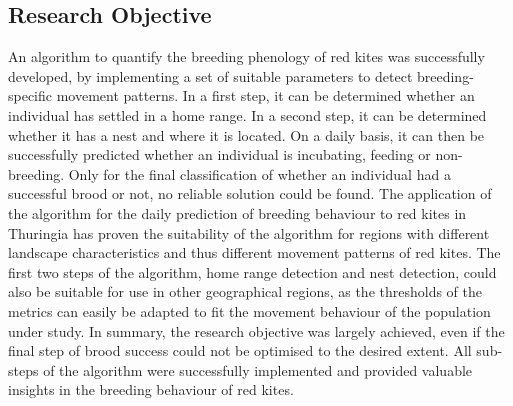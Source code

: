 \subsection{Research Objective}
An algorithm to quantify the breeding phenology of red kites was successfully developed, by implementing a set of suitable parameters to detect breeding-specific movement patterns. In a first step, it can be determined whether an individual has settled in a home range. In a second step, it can be determined whether it has a nest and where it is located. On a daily basis, it can then be successfully predicted whether an individual is incubating, feeding or non-breeding. Only for the final classification of whether an individual had a successful brood or not, no reliable solution could be found. The application of the algorithm for the daily prediction of breeding behaviour to red kites in Thuringia has proven the suitability of the algorithm for regions with different landscape characteristics and thus different movement patterns of red kites. The first two steps of the algorithm, home range detection and nest detection, could also be suitable for use in other geographical regions, as the thresholds of the metrics can easily be adapted to fit the movement behaviour of the population under study. In summary, the research objective was largely achieved, even if the final step of brood success could not be optimised to the desired extent. All sub-steps of the algorithm were successfully implemented and provided valuable insights in the breeding behaviour of red kites.
